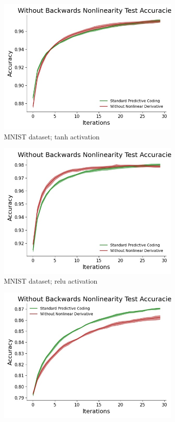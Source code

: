 \begin{figure}[ht] 
 \begin{subfigure}[b]{0.5\linewidth}
 \centering
 \includegraphics[width=0.75\linewidth]{chapter_3_figures/mnist_tanh_Without_Backwards_Nonlinearity_Test_Accuracies_prelim_2.jpg} 
 \caption{\small MNIST dataset; tanh activation} 
 \vspace{4ex}
 \end{subfigure}%
 \begin{subfigure}[b]{0.5\linewidth}
 \centering
 \includegraphics[width=0.75\linewidth]{chapter_3_figures/mnist_relu_Without_Backwards_Nonlinearity_Test_Accuracies_prelim_2.jpg} 
 \caption{\small MNIST dataset; relu activation} 
 \vspace{4ex}
 \end{subfigure} 
 \begin{subfigure}[b]{0.5\linewidth}
 \centering
 \includegraphics[width=0.75\linewidth]{chapter_3_figures/fashion_tanh_Without_Backwards_Nonlinearity_Test_Accuracies_prelim_2.jpg} 

\end{subfigure}
\end{figure}
